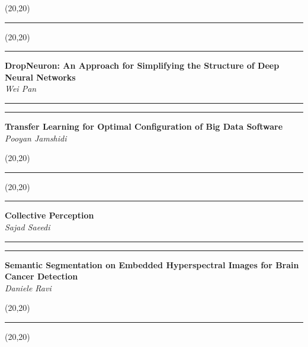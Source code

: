 \documentclass[11pt]{article}
\newcommand{\talk}[1]{\Large\flushleft\textbf{#1}\\}
\newcommand{\speaker}[1]{\textit{#1}\\}
\newcommand{\separator}{\noindent\rule{\linewidth}{0.1mm}}
\newcommand{\votebox}{\vspace{-5cm}\noindent\hfill\framebox(20,20){}}
\newcommand{\hstrut}{\noindent\color{iclightblue}\rule{\linewidth}{0pt}}
\begin{document}
\vfill
\noindent
\begin{minipage}[b]{0.49\linewidth}
\votebox%
\end{minipage}
\begin{minipage}[b]{0.02\linewidth}
\hstrut%
\end{minipage}
\begin{minipage}[b]{0.49\linewidth}
\votebox%
\end{minipage}
\noindent
\begin{minipage}[t]{0.49\linewidth}
\separator%
\talk{DropNeuron: An Approach for Simplifying the Structure of Deep Neural
      Networks}
\speaker{Wei Pan}
\end{minipage}
\begin{minipage}[t]{0.02\linewidth}
\hstrut%
\end{minipage}
\begin{minipage}[t]{0.49\linewidth}
\separator%
\talk{Transfer Learning for Optimal Configuration of Big Data Software}
\speaker{Pooyan Jamshidi}
\end{minipage}
\vfill
\noindent
\begin{minipage}[b]{0.49\linewidth}
\votebox%
\end{minipage}
\begin{minipage}[b]{0.02\linewidth}
\hstrut%
\end{minipage}
\begin{minipage}[b]{0.49\linewidth}
\votebox%
\end{minipage}
\noindent
\begin{minipage}[t]{0.49\linewidth}
\separator%
\talk{Collective Perception}
\speaker{Sajad Saeedi}
\end{minipage}
\begin{minipage}[t]{0.02\linewidth}
\hstrut%
\end{minipage}
\begin{minipage}[t]{0.49\linewidth}
\separator%
\talk{Semantic Segmentation on Embedded Hyperspectral Images for Brain Cancer
      Detection}
\speaker{Daniele Ravi}
\end{minipage}
\vfill
\noindent
\begin{minipage}[b]{0.49\linewidth}
\votebox%
\end{minipage}
\begin{minipage}[b]{0.02\linewidth}
\hstrut%
\end{minipage}
\begin{minipage}[b]{0.49\linewidth}
\votebox%
\end{minipage}
\noindent
\end{document}
